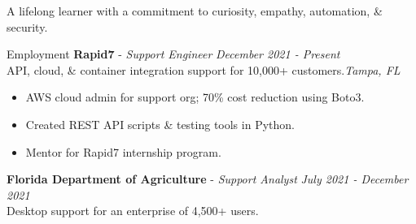 \documentclass{resume} %
\begin{document}
	\begin{center}{\vspace{-0.1cm}A lifelong learner with a commitment to curiosity, empathy, automation, \& security.\vspace{-0.1cm}}\end{center}
{\small
	\begin{rSection}{Employment}
		{\bf Rapid7} - {\em Support Engineer} \hfill {\em December 2021 - Present}\\
		API, cloud, \& container integration support for 10,000+ customers.\hfill {\em Tampa, FL}
		\begin{itemize}
			\vspace{-0.2cm} \item AWS cloud admin for support org; 70\% cost reduction using Boto3.
			\vspace{-0.2cm} \item Created REST API scripts \& testing tools in Python.
			\vspace{-0.2cm} \item Mentor for Rapid7 internship program.
		\end{itemize}
		{\bf Florida Department of Agriculture} - {\em Support Analyst} \hfill {\em July 2021 - December 2021}\\
		Desktop support for an enterprise of 4,500+ users.
		

\end{rSection}}
\end{document}
